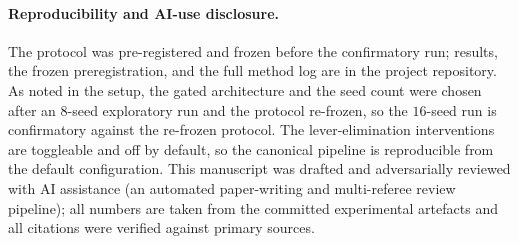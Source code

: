 \documentclass[11pt]{article}
\begin{document}
\paragraph{Reproducibility and AI-use disclosure.}
The protocol was pre-registered and frozen before the confirmatory run; results, the frozen
preregistration, and the full method log are in the project repository. As noted in the setup, the
gated architecture and the seed count were chosen after an $8$-seed exploratory run and the protocol
re-frozen, so the $16$-seed run is confirmatory against the re-frozen protocol. The lever-elimination
interventions are toggleable and off by default, so the canonical pipeline is reproducible from the
default configuration. This manuscript was drafted and adversarially reviewed with AI assistance (an
automated paper-writing and multi-referee review pipeline); all numbers are taken from the committed
experimental artefacts and all citations were verified against primary sources.



\end{document}
